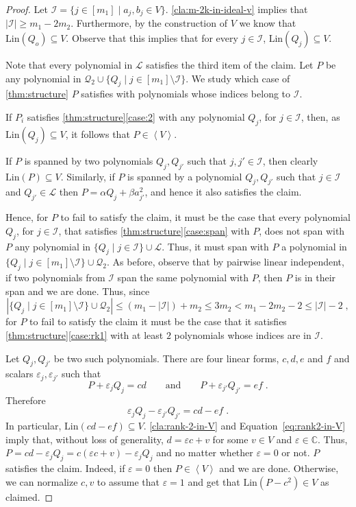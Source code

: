 \documentclass[10pt,a4paper]{article}
\renewcommand{\C}{\mathbb{C}}
\newcommand{\cI}{{\mathcal{I}}}
\newcommand{\calL}{{\mathcal{L}}}
\newcommand{\cQ}{{\mathcal{Q}}}
\newcommand{\ideal}[1]{\left \langle{#1}\right \rangle}
\def\epsilon{\varepsilon}
\newcommand{\MS}{\text{Lin}}
\begin{document}
\begin{proof}
Let $\cI = \lbrace j\in [m_1] \mid  a_j,b_j \in V\rbrace$.  \autoref{cla:m-2k-in-ideal-v} implies that $|\cI|\geq m_1-2m_2$. Furthermore, by the construction of $V$ we know that $\MS(Q_o)\subseteq V$. Observe that this implies that for every $j\in \cI$, $\MS(Q_j)\subseteq V$.

Note that every polynomial in $\calL$ satisfies the third item of the claim.
Let $P$ be any polynomial in $\cQ_2 \cup \{Q_j \mid j\in [m_1]\setminus \cI\}$. We study which case of \autoref{thm:structure} $P$ satisfies with polynomials whose indices belong to $\cI$.



If $P_i$ satisfies \autoref{thm:structure}\ref{case:2} with any polynomial $Q_j$, for $j\in \cI$, then, as $\MS(Q_j)\subseteq V$, it follows that  $P\in \ideal{V}$.

If $P$ is spanned by two polynomials $Q_j,Q_{j'}$ such that $j,j'\in \cI$, then clearly $\MS(P)\subseteq V$. Similarly, if $P$ is spanned by a polynomial $Q_j,Q_{j'}$ such that $j \in \cI$ and $Q_{j'}\in \calL$ then $P = \alpha Q_j + \beta a_{j'}^2$, and hence it also satisfies the claim.

Hence, for $P$ to fail to satisfy the claim, it must be the case that every polynomial $Q_j$, for $j\in\cI$, that satisfies \autoref{thm:structure}\ref{case:span} with $P$, does not span with $P$ any polynomial in $\{Q_j \mid j\in  \cI\} \cup \calL$. Thus, it must span with $P$ a polynomial in $\{Q_j \mid j\in [m_1]\setminus  \cI\} \cup \cQ_2$. As before, observe that by pairwise linear independent, if two polynomials from $\cI$ span the same polynomial with $P$, then $P$ is in their span and we are done. Thus, since 
$$\left|\{Q_j \mid j\in [m_1]\setminus  \cI\} \cup \cQ_2\right| \leq \left(m_1 - |\cI| \right) + m_2 \leq 3m_2 < m_1 -2m_2 -2 \leq |\cI| -2 \;,$$
for $P$ to fail to satisfy the claim it must be the case that 
it satisfies \autoref{thm:structure}\ref{case:rk1} with at least $2$ polynomials whose indices are in $\cI$. 

Let $Q_j,Q_{j'}$ be two such polynomials. There are four linear forms, $c,d,e$ and $f$ and scalars $\epsilon_j, \epsilon_{j'}$ such that
\begin{equation*}
P + \varepsilon_j Q_j = cd \quad\quad \text{and}\quad\quad
P + \varepsilon_{j'} Q_{j'} = ef \;.
\end{equation*} 
Therefore
\begin{equation} \label{eq:rank2-in-V}
\varepsilon_j Q_j -\varepsilon_{j'} Q_{j'} = cd -ef \;.
\end{equation} 
In particular, $\MS(cd -ef)\subseteq V$. \autoref{cla:rank-2-in-V} and Equation~\eqref{eq:rank2-in-V} imply that, without loss of generality,  $d = \epsilon c + v$ for some $v \in V$ and $\epsilon \in \C$. 
Thus, $P = cd -\varepsilon_j Q_j = c(\epsilon c+v) -\varepsilon_jQ_j$ and no matter whether $\epsilon=0$ or not. $P$ satisfies the claim. Indeed, if $\epsilon = 0$ then $P \in \ideal{V}$ and we are done. Otherwise, we can normalize $c,v$ to  assume that $\epsilon = 1$ and get that $\MS(P-c^2)\in V$ as claimed. 


\end{proof}
\end{document}
